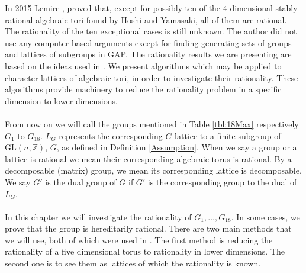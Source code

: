 \documentclass{article}
\theoremstyle{plain}
\theoremstyle{definition}
\newcommand{\Z}{\ensuremath{\mathbb{Z}}}
\begin{document}
\noindent
In 2015 Lemire \cite{Nicole1}, proved that, except for possibly ten of the 
4 dimensional stably rational algebraic tori found by Hoshi and Yamasaki, 
all of them are rational. The rationality of the ten exceptional cases is 
still unknown. The author did not use any computer based arguments except 
for finding generating sets of groups and lattices of subgroups in GAP. The 
rationality results we are presenting are based on the ideas used in \cite{Nicole1}. 
We present algorithms which may be applied to character lattices of algebraic 
tori, in order to investigate their rationality. These algorithms provide 
machinery to reduce the rationality problem in a specific dimension to lower dimensions.\\
\\
From now on we will call the groups mentioned in Table \ref{tbl:18Max} 
respectively $G_1$ to $G_{18}$. $L_G$ represents the corresponding $G$-lattice 
to a finite subgroup of $\mathrm{GL}(n,\Z)$, $G$, as defined in Definition 
\ref{Assumption}. When we say a group or a lattice is rational we mean their 
corresponding algebraic torus is rational. By a decomposable (matrix) group, 
we mean its corresponding lattice is decomposable. We say $G'$ is the dual 
group of $G$ if $G'$ is the corresponding group to the dual of $L_G$.  \\
\\
In this chapter we will investigate the rationality of $G_1, \ldots ,  G_{18}$. 
In some cases, we prove that the group is hereditarily rational. There are two 
main methods that we will use, both of which were used in \cite{Nicole1}. The 
first method is reducing the rationality of a five dimensional torus to rationality 
in lower dimensions. The second one is to see them as lattices of which the rationality is known.
\end{document}
